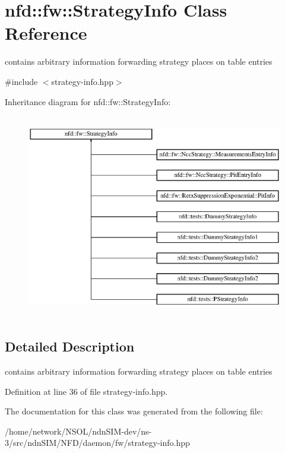 \hypertarget{classnfd_1_1fw_1_1StrategyInfo}{}\section{nfd\+:\+:fw\+:\+:Strategy\+Info Class Reference}
\label{classnfd_1_1fw_1_1StrategyInfo}


contains arbitrary information forwarding strategy places on table entries  




{\ttfamily \#include $<$strategy-\/info.\+hpp$>$}

Inheritance diagram for nfd\+:\+:fw\+:\+:Strategy\+Info\+:\begin{figure}[H]
\begin{center}
\leavevmode
\includegraphics[height=9.000000cm]{classnfd_1_1fw_1_1StrategyInfo}
\end{center}
\end{figure}


\subsection{Detailed Description}
contains arbitrary information forwarding strategy places on table entries 

Definition at line 36 of file strategy-\/info.\+hpp.



The documentation for this class was generated from the following file\+:\begin{DoxyCompactItemize}
\item 
/home/network/\+N\+S\+O\+L/ndn\+S\+I\+M-\/dev/ns-\/3/src/ndn\+S\+I\+M/\+N\+F\+D/daemon/fw/strategy-\/info.\+hpp\end{DoxyCompactItemize}
